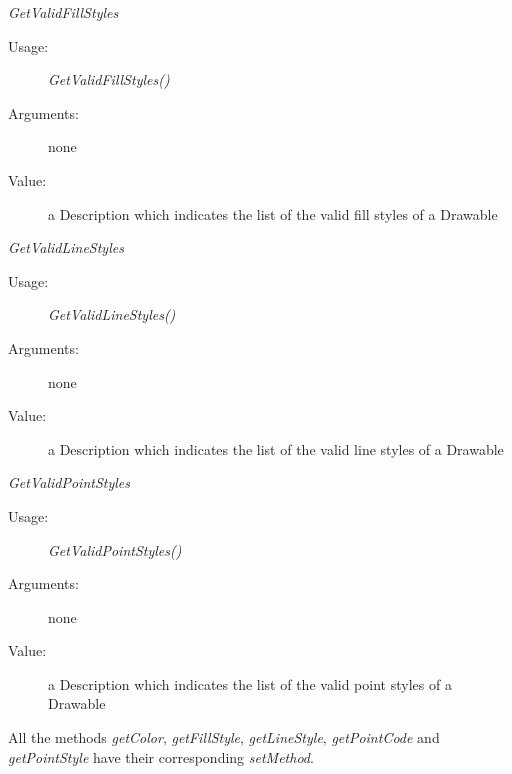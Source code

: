 \begin{description}
\begin{description}
\begin{description}
    \end{description}
    \bigskip
  \item \textit{GetValidFillStyles}
    \begin{description}
    \item[Usage:] \textit{GetValidFillStyles()}
    \item[Arguments:] none
    \item[Value:] a Description which indicates the list of the valid fill styles of a Drawable
    \end{description}
    \bigskip
  \item \textit{GetValidLineStyles}
    \begin{description}
    \item[Usage:] \textit{GetValidLineStyles()}
    \item[Arguments:] none
    \item[Value:] a Description which indicates the list of the valid line styles of a Drawable
    \end{description}
    \bigskip
  \item \textit{GetValidPointStyles}
    \begin{description}
    \item[Usage:] \textit{GetValidPointStyles()}
    \item[Arguments:] none
    \item[Value:] a Description which indicates the list of the valid point  styles of a Drawable
    \end{description}
  \end{description}
\end{description}

All the methods \textit{getColor}, \textit{getFillStyle}, \textit{getLineStyle}, \textit{getPointCode} and \textit{getPointStyle} have their corresponding \textit{setMethod}.\\

